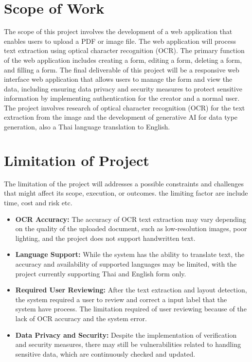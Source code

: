 \documentclass[12pt,oneside,openright,a4paper]{cpe-english-project}
\begin{document}
\section{Scope of Work}

The scope of this project involves the development of a web application that enables users to upload a PDF or image file. The web application will process text extraction using optical character recognition (OCR). The primary function of the web application includes creating a form, editing a form, deleting a form, and filling a form. The final deliverable of this project will be a responsive web interface web application that allows users to manage the form and view the data, including ensuring data privacy and security measures to protect sensitive information by implementing authentication for the creator and a normal user. The project involves research of optical character recognition (OCR) for the text extraction from the image and the development of generative AI for data type generation, also a Thai language translation to English.

\section{Limitation of Project}
The limitation of the project will addresses a possible constraints and challenges that might affect its scope, execution, or outcomes. the limiting factor are include time, cost and risk etc.

\begin{itemize}
 \item \textbf{OCR Accuracy:} The accuracy of OCR text extraction may vary depending on the quality of the uploaded document, such as low-resolution images, poor lighting, and the project does not support handwritten text.
 
    \item \textbf{Language Support:} While the system has the ability to translate text, the accuracy and availability of supported languages may be limited, with the project currently supporting Thai and English form only.
    
    \item \textbf{Required User Reviewing:} After the text extraction and layout detection, the system required a user to review and correct a input label that the system have process. The limitation required of user reviewing because of the lack of OCR accuracy and the system error.
      
    \item \textbf{Data Privacy and Security:} Despite the implementation of verification and security measures, there may still be vulnerabilities related to handling sensitive data, which are continuously checked and updated.
\end{itemize}
\end{document}

